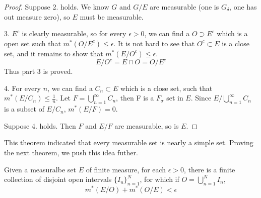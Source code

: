 \documentclass[lang=en, 12pt]{elegantbook}
\begin{document}
\begin{proof}
                Suppose 2. holds. We know $G$ and $G/E$ are measurable (one is $G_{\delta}$, one has out measure zero), so $E$ must be 
            measurable.\par
            3. $E^c$ is clearly measurable, so for every $\epsilon > 0$, we can find a $O \supset E^c$ which is a open set such that 
        $m^*(O/E^c) \leq \epsilon$. It is not hard to see that $O^c \subset E$ is a close set, and it remains to show that $m^*(E/O^c) \leq \epsilon$.
        $$E/O^c = E \cap O = O/E^c$$ Thus part 3 is proved.\par
            4. For every $n$, we can find a $C_n \subset E$ which is a close set, such that $m^*(E/C_n) \leq \frac{1}{n}$. Let 
        $F=\bigcup_{n=1}^{\infty} C_n$, then F is a $F_{\sigma}$ set in $E$. Since $E/\bigcup_{n=1}^{\infty}C_n$ is a subset of $E/C_n$,
        $m^*(E/F)=0$.\par
            Suppose 4. holds. Then $F$ and $E/F$ are measurable, so is $E$.
            \end{proof}
            This theorem indicated that every measurable set is nearly a simple set. Proving the next theorem, we push this idea futher.
            \begin{theorem}\label{LittlewoodFirstPrinciple}
                Given a measuralbe set $E$ of finite measure, for each $\epsilon > 0$, there is a finite collection of disjoint open intervals
            $\{I_n\}_{n=1}^N$, for which if $O = \bigcup_{n=1}^{N} I_n$,
                \begin{equation}
                    m^*(E/O)+m^*(O/E) < \epsilon
                \end{equation} \par
            \end{theorem}
\end{document}
